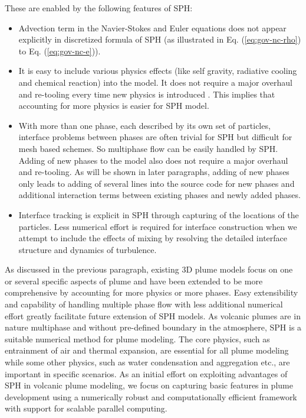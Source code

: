 These are enabled by the following features of SPH:
\begin{itemize}
\item Advection term in the Navier-Stokes and Euler equations does not appear explicitly in discretized formula of SPH (as illustrated in Eq. (\ref{eq:gov-nc-rho}) to Eq. (\ref{eq:gov-nc-e})).
\item It is easy to include various physics effects (like self gravity, radiative cooling and chemical reaction) into the model. It does not require a major overhaul and re-tooling every time new physics is introduced \citep{monaghan1995sph}. This implies that accounting for more physics is easier for SPH model.
\item With more than one phase, each described by its own set of particles, interface problems between phases are often trivial for SPH but difficult for mesh based schemes. So multiphase flow can be easily handled by SPH. Adding of new phases to the model also does not require a major overhaul and re-tooling. As will be shown in later paragraphs, adding of new phases only leads to adding of several lines into the source code for new phases and additional interaction terms between existing phases and newly added phases.
\item Interface tracking is explicit in SPH through capturing of the locations of the particles. Less numerical effort is required for interface construction when we attempt to include the effects of mixing by resolving the detailed interface structure and dynamics of turbulence.
\end{itemize}

As discussed in the previous paragraph, existing 3D plume models focus on one or several specific aspects of plume and have been extended to be more comprehensive by accounting for more physics or more phases. Easy extensibility and capability of handling multiple phase flow with less additional numerical effort greatly facilitate future extension of SPH models. As volcanic plumes are in nature multiphase and without pre-defined boundary in the atmosphere, SPH is a suitable numerical method for plume modeling. The core physics, such as entrainment of air and thermal expansion, are essential for all plume modeling while some other physics, such as water condensation and aggregation etc., are important in specific scenarios. As an initial effort on exploiting advantages of SPH in volcanic plume modeling, we focus on capturing basic features in plume development using a numerically robust and computationally efficient framework with support for scalable parallel computing. %

